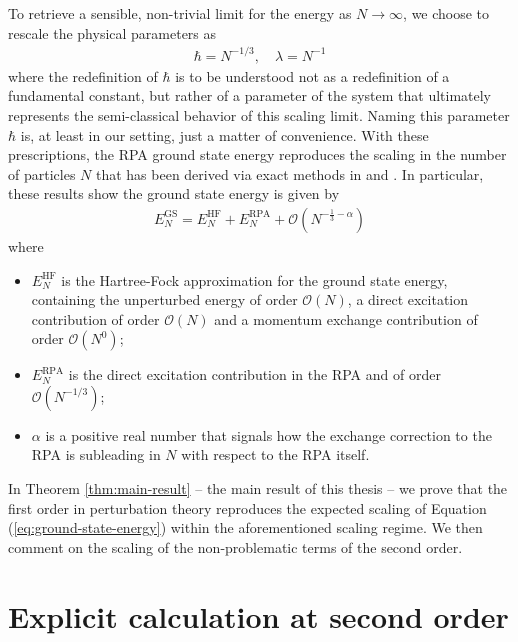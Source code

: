 To retrieve a sensible, non-trivial limit for the energy as $N\to\infty$, we choose to rescale
the physical parameters \cite{BenArt} as
\begin{align}
	\label{eq:mean-field-scaling}
	\hbar = N^{-1/3},\quad\lambda = N^{-1}
\end{align}
where the redefinition of $\hbar$ is to be understood not as a redefinition of a fundamental
constant, but rather of a parameter of the system that ultimately represents the semi-classical
behavior of this scaling limit. Naming this parameter $\hbar$ is, at least in our setting,
just a matter of convenience.
With these prescriptions, the RPA ground state energy reproduces the scaling in the number of
particles $N$ that has been derived via exact methods in \cite{BenArt} and \cite{HPRArt}. In
particular, these results show the ground state energy is given by
\begin{align}
	\label{eq:ground-state-energy}
	E^{\mathrm{GS}}_N = E^{\mathrm{HF}}_N + E^{\mathrm{RPA}}_N
	+ \mathcal{O}(N^{-\frac{1}{3}-\alpha})
\end{align}
where
\begin{itemize}
	\item $E^{\mathrm{HF}}_N$ is the Hartree-Fock approximation for the ground state energy, containing
		the unperturbed energy of order $\mathcal{O}(N)$, a direct excitation contribution of
		order $\mathcal{O}(N)$ and a momentum exchange contribution of order $\mathcal{O}(N^0)$;
	\item $E^{\mathrm{RPA}}_N$ is the direct excitation contribution in the RPA and of order
		$\mathcal{O}(N^{-1/3})$;
	\item $\alpha$ is a positive real number that signals how the exchange correction to the RPA
		is subleading in $N$ with respect to the RPA itself.
\end{itemize}
In Theorem \ref{thm:main-result} -- the main result of this thesis -- we prove that the first
order in perturbation theory reproduces the expected scaling of Equation
(\ref{eq:ground-state-energy}) within the aforementioned scaling regime. We then comment on
the scaling of the non-problematic terms of the second order.

\section{Explicit calculation at second order}
\label{second-order}

